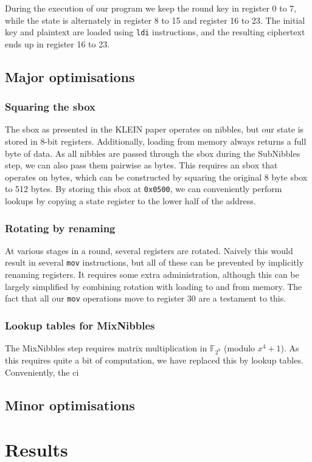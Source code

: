 \documentclass[a4paper]{article}
\begin{document}
During the execution of our program we keep the round key in register 0 to 7, while the state is alternately in register 8 to 15 and register 16 to 23. The initial key and plaintext are loaded using {\tt ldi} instructions, and the resulting ciphertext ends up in register 16 to 23.

\subsection{Major optimisations}

\subsubsection{Squaring the sbox}

The sbox as presented in the KLEIN paper operates on nibbles, but our state is stored in 8-bit registers. Additionally, loading from memory always returns a full byte of data. As all nibbles are passed through the sbox during the SubNibbles step, we can also pass them pairwise as bytes. This requires an sbox that operates on bytes, which can be constructed by squaring the original 8 byte sbox to 512 bytes. By storing this sbox at {\tt 0x0500}, we can conveniently perform lookups by copying a state register to the lower half of the address.

\subsubsection{Rotating by renaming}

At various stages in a round, several registers are rotated. Naively this would result in several {\tt mov} instructions, but all of these can be prevented by implicitly renaming registers. It requires some extra administration, although this can be largely simplified by combining rotation with loading to and from memory. The fact that all our {\tt mov} operations move to register 30 are a testament to this.

\subsubsection{Lookup tables for MixNibbles}

The MixNibbles step requires matrix multiplication in $\mathbb{F}_{2^8}$ (modulo $x^4 + 1$). As this requires quite a bit of computation, we have replaced this by lookup tables. Conveniently, the ci

\subsection{Minor optimisations}

\section{Results}

\end{document}
